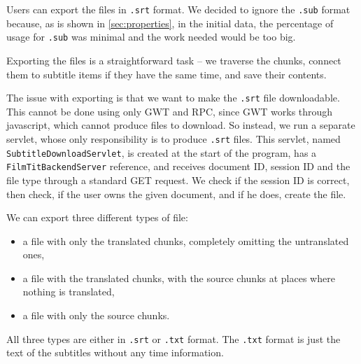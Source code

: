 Users can export the files in {\tt .srt} format. We decided to ignore the {\tt .sub} format because, as is shown in \ref{sec:properties}, in the initial data, the percentage of usage for {\tt .sub} was minimal and the work needed would be too big.

Exporting the files is a straightforward task -- we traverse the chunks, connect them to subtitle items if they have the same time, and save their contents.



The issue with exporting is that we want to make the {\tt .srt} file downloadable. This cannot be done using only GWT and RPC, since GWT works through javascript, which cannot produce files to download. So instead, we run a separate servlet, whose only responsibility is to produce {\tt .srt} files. This servlet, named \texttt{SubtitleDownloadServlet}, is created at the start of the program, has a \texttt{FilmTitBackendServer} reference, and receives document ID, session ID and the file type through a standard GET request. We check if the session ID is correct, then check, if the user owns the given document, and if he does, create the file.

We can export three different types of file:
\begin{itemize}
    \item a file with only the translated chunks, completely omitting the untranslated ones,
    \item a file with the translated chunks, with the source chunks at places where nothing is translated,
    \item a file with only the source chunks.
\end{itemize}

All three types are either in {\tt .srt} or {\tt .txt} format. The {\tt .txt} format is just the text of the subtitles without any time information.